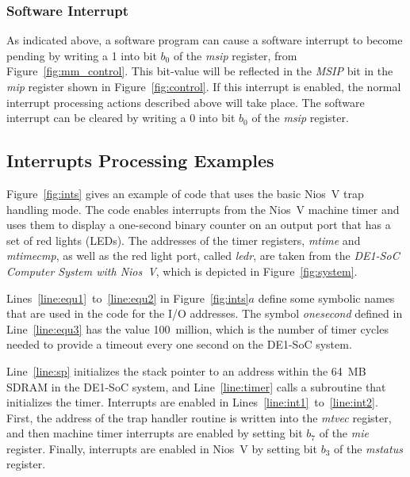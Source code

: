 \documentclass[11pt, twoside, pdftex]{article}
\begin{document}
\subsubsection{Software Interrupt}
\label{sec:swi}

As indicated above, a software program can cause a software interrupt to become pending by
writing a 1 into bit $b_0$ of the {\it msip} register, from Figure~\ref{fig:mm_control}.
This bit-value will be reflected in the {\it MSIP} bit in the {\it mip} register shown 
in Figure~\ref{fig:control}. If this interrupt is enabled, the normal interrupt processing 
actions described above will take place. The software interrupt can be cleared by writing a 0 
into bit $b_0$ of the {\it msip} register.

\subsection{Interrupts Processing Examples}

Figure~\ref{fig:ints} gives an example of code that uses the basic Nios~V trap handling mode.
The code
enables interrupts from the Nios~V machine timer and uses them to display a one-second binary
counter on an output port that has a set of red lights (LEDs). The addresses of the timer
registers, {\it mtime} and {\it mtimecmp}, as well as the red light port, called {\it ledr},
are taken from the {\it DE1-SoC Computer System with Nios~V}, which is depicted in 
Figure~\ref{fig:system}. 

Lines~\ref{line:equ1}~to~\ref{line:equ2} in Figure~\ref{fig:ints}$a$ define some symbolic 
names that are used in the code for the I/O addresses. The symbol {\it onesecond}
defined in Line~\ref{line:equ3} has the value 100~million, which is the number of timer 
cycles needed to provide a timeout every one second on the DE1-SoC system.

Line~\ref{line:sp} initializes the stack pointer to an address within the 64~MB SDRAM 
in the DE1-SoC system, and Line~\ref{line:timer} calls a subroutine that initializes the timer. 
Interrupts are enabled in Lines~\ref{line:int1}~to~\ref{line:int2}. First, the address of
the trap handler routine is written into the {\it mtvec} register, and then machine timer 
interrupts are enabled by setting bit $b_7$ of the {\it mie} register. Finally, interrupts 
are enabled in Nios~V by setting bit $b_3$ of the {\it mstatus} register.
\end{document}
